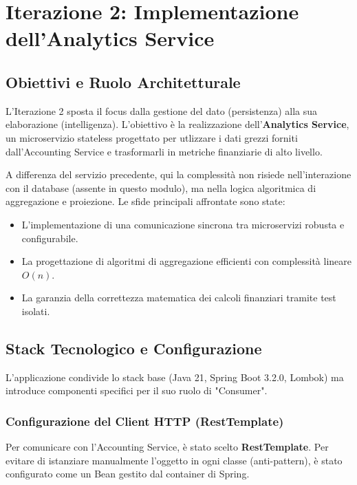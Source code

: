 \chapter{Iterazione 2: Implementazione dell'Analytics Service}
\label{chap:iterazione2}

\section{Obiettivi e Ruolo Architetturale}

L'Iterazione 2 sposta il focus dalla gestione del dato (persistenza) alla sua elaborazione (intelligenza). L'obiettivo è la realizzazione dell'\textbf{Analytics Service}, un microservizio stateless progettato per utlizzare i dati grezzi forniti dall'Accounting Service e trasformarli in metriche finanziarie di alto livello.

A differenza del servizio precedente, qui la complessità non risiede nell'interazione con il database (assente in questo modulo), ma nella logica algoritmica di aggregazione e proiezione. Le sfide principali affrontate sono state:
\begin{itemize}
    \item L'implementazione di una comunicazione sincrona tra microservizi robusta e configurabile.
    \item La progettazione di algoritmi di aggregazione efficienti con complessità lineare $O(n)$.
    \item La garanzia della correttezza matematica dei calcoli finanziari tramite test isolati.
\end{itemize}

\section{Stack Tecnologico e Configurazione}

L'applicazione condivide lo stack base (Java 21, Spring Boot 3.2.0, Lombok) ma introduce componenti specifici per il suo ruolo di "Consumer".

\subsection{Configurazione del Client HTTP (RestTemplate)}
Per comunicare con l'Accounting Service, è stato scelto \textbf{RestTemplate}. Per evitare di istanziare manualmente l'oggetto in ogni classe (anti-pattern), è stato configurato come un Bean gestito dal container di Spring.

